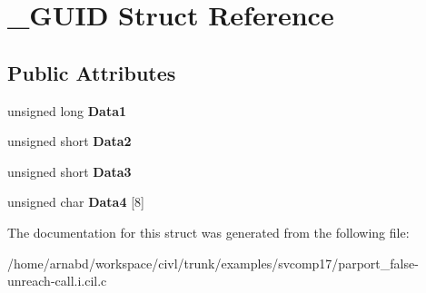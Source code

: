 \hypertarget{struct__GUID}{}\section{\+\_\+\+G\+U\+I\+D Struct Reference}
\label{struct__GUID}
\subsection*{Public Attributes}
\begin{DoxyCompactItemize}
\item 
\hypertarget{struct__GUID_a361004d1e9818d28fd8abb71d72c5373}{}unsigned long {\bfseries Data1}\label{struct__GUID_a361004d1e9818d28fd8abb71d72c5373}

\item 
\hypertarget{struct__GUID_ac0ad0a061c9fab316d495ab2a6a5906d}{}unsigned short {\bfseries Data2}\label{struct__GUID_ac0ad0a061c9fab316d495ab2a6a5906d}

\item 
\hypertarget{struct__GUID_ae6ba08acc6fcc433c0b47fbc5270cdaf}{}unsigned short {\bfseries Data3}\label{struct__GUID_ae6ba08acc6fcc433c0b47fbc5270cdaf}

\item 
\hypertarget{struct__GUID_ae634828d65d29d37baf0108020206487}{}unsigned char {\bfseries Data4} \mbox{[}8\mbox{]}\label{struct__GUID_ae634828d65d29d37baf0108020206487}

\end{DoxyCompactItemize}


The documentation for this struct was generated from the following file\+:\begin{DoxyCompactItemize}
\item 
/home/arnabd/workspace/civl/trunk/examples/svcomp17/parport\+\_\+false-\/unreach-\/call.\+i.\+cil.\+c\end{DoxyCompactItemize}
